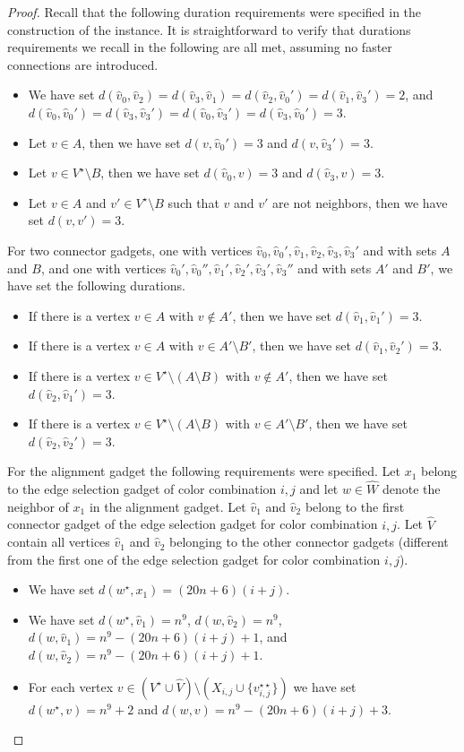 \documentclass[a4paper,UKenglish,cleveref, autoref, thm-restate]{lipics-v2021}
\begin{document}
\begin{proof}
Recall that the following duration requirements were specified in the construction of the instance. It is straightforward to verify that durations requirements we recall in the following are all met, assuming no faster connections are introduced.
\begin{itemize}
    \item We have set $d(\hat{v}_0,\hat{v}_2)=d(\hat{v}_3,\hat{v}_1)=d(\hat{v}_2,\hat{v}_0')=d(\hat{v}_1,\hat{v}_3')=2$, and $d(\hat{v}_0,\hat{v}_0')=d(\hat{v}_3,\hat{v}_3')=d(\hat{v}_0,\hat{v}_3')=d(\hat{v}_3,\hat{v}_0')=3$.
    \item Let $v\in A$, then we have set $d(v,\hat{v}_0')=3$ and $d(v,\hat{v}_3')=3$.
    \item Let $v\in V^\star\setminus B$, then we have set $d(\hat{v}_0,v)=3$ and $d(\hat{v}_3,v)=3$.
    \item Let $v\in A$ and $v'\in V^\star\setminus B$ such that $v$ and $v'$ are not neighbors, then we have set $d(v,v')=3$.
\end{itemize}
For two connector gadgets, one with vertices $\hat{v}_0,\hat{v}_0',\hat{v}_1,\hat{v}_2,\hat{v}_3,\hat{v}_3'$ and with sets $A$ and $B$, and one with vertices $\hat{v}_0',\hat{v}_0'',\hat{v}_1',\hat{v}_2',\hat{v}_3',\hat{v}_3''$ and with sets $A'$ and $B'$, we have set the following durations.
\begin{itemize}
    \item If there is a vertex $v\in A$ with $v\notin A'$, then we have set $d(\hat{v}_1,\hat{v}_1')=3$.
    \item If there is a vertex $v\in A$ with $v\in A'\setminus B'$, then we have set $d(\hat{v}_1,\hat{v}_2')=3$.
    \item If there is a vertex $v\in V^\star\setminus (A\setminus B)$ with $v\notin A'$, then we have set $d(\hat{v}_2,\hat{v}_1')=3$.    
    \item If there is a vertex $v\in V^\star\setminus (A\setminus B)$ with $v\in A'\setminus B'$, then we have set $d(\hat{v}_2,\hat{v}_2')=3$.
\end{itemize}

 For the alignment gadget the following requirements were specified. Let $x_1$ belong to the edge selection gadget of color combination $i,j$ and let $w\in \hat{W}$ denote the neighbor of $x_1$ in the alignment gadget. Let $\hat{v}_1$ and $\hat{v}_2$ belong to the first connector gadget of the edge selection gadget for color combination $i,j$. Let $\hat{V}$ contain all vertices $\hat{v}_1$ and $\hat{v}_2$ belonging to the other connector gadgets (different from the first one of the edge selection gadget for color combination $i,j$). 
\begin{itemize}
    \item We have set $d(w^\star,x_1)=(20n+6)(i+j)$.
    \item We have set $d(w^\star,\hat{v}_1)=n^9$, $d(w,\hat{v}_2)=n^9$, $d(w,\hat{v}_1)=n^9-(20n+6)(i+j)+1$, and $d(w,\hat{v}_2)=n^9-(20n+6)(i+j)+1$.
    \item For each vertex $v\in (V^\star\cup \hat{V})\setminus (X_{i,j}\cup \{v_{i,j}^{\star\star}\})$ we have set $d(w^\star,v)=n^9+2$ and $d(w,v)=n^9-(20n+6)(i+j)+3$.
\end{itemize}


\end{proof}
\end{document}
